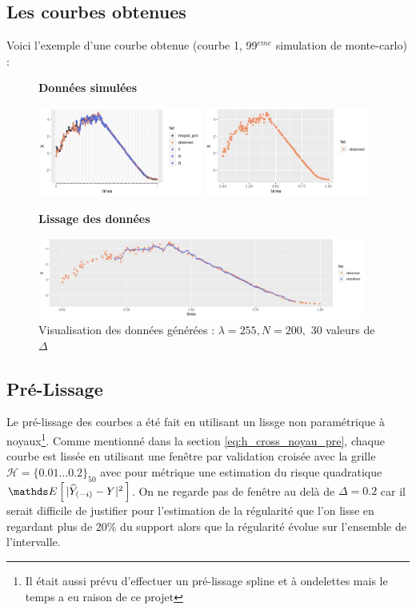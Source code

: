 \subsection{Les courbes obtenues}

Voici l'exemple d'une courbe obtenue (courbe 1, 99$^{eme}$ simulation de monte-carlo) :

\begin{figure}[H]
	\centering
	\textbf{Données simulées}

	\includegraphics[width=0.48\textwidth]{Images/simul/all.jpeg}
	\includegraphics[width=0.48\textwidth]{Images/simul/observed.jpeg}

	\textbf{Lissage des données}

	\includegraphics[width=0.96\textwidth]{Images/simul/smoothed.jpeg}
	\caption{Visualisation des données générées : $\lambda = 255, N = 200,$ 30 valeurs de $\Delta$}
\end{figure}


\subsection{Pré-Lissage}

Le pré-lissage des courbes a été fait en utilisant un lissge non paramétrique à noyaux\footnote{Il était aussi prévu d'effectuer un pré-lissage spline et à ondelettes mais le temps a eu raison de ce projet}. Comme mentionné dans la section \ref{eq:h_cross_noyau_pre}, chaque courbe est lissée en utilisant une fenêtre par validation croisée avec la grille $\mathcal H= \{ 0.01 \dots 0.2 \}_{50}$ avec pour métrique une estimation du risque quadratique $\esperance{|\widehat Y_{(-i)} - Y|^2}$. On ne regarde pas de fenêtre au delà de $\Delta = 0.2$ car il serait difficile de justifier pour l'estimation de la régularité que l'on lisse en regardant plus de $20$\% du support alors que la régularité évolue sur l'ensemble de l'intervalle.

